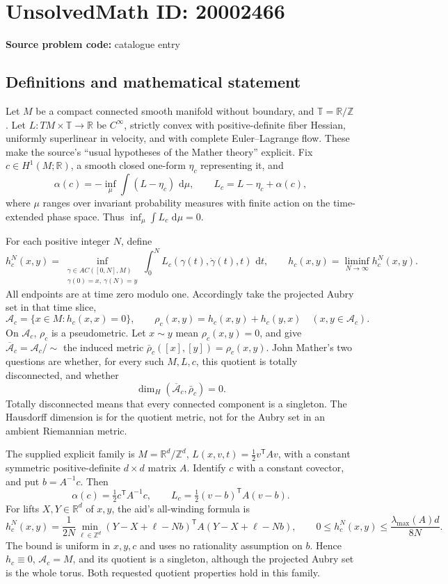 \documentclass[11pt]{article}
\newcommand{\Z}{\mathbb{Z}}
\newcommand{\R}{\mathbb{R}}
\newcommand{\dd}{\,\mathrm{d}}
\begin{document}
\section*{UnsolvedMath ID: 20002466}
\textbf{Source problem code:} catalogue entry
\subsection{Definitions and mathematical statement}
Let \(M\) be a compact connected smooth manifold without boundary, and \(\mathbb T=\R/\Z\). Let \(L:TM\times\mathbb T\to\R\) be \(C^\infty\), strictly convex with positive-definite fiber Hessian, uniformly superlinear in velocity, and with complete Euler--Lagrange flow. These make the source's ``usual hypotheses of the Mather theory'' explicit. Fix \(c\in H^1(M;\R)\), a smooth closed one-form \(\eta_c\) representing it, and
\[
 \alpha(c)=-\inf_\mu\int(L-\eta_c)\,\dd\mu,\qquad
 L_c=L-\eta_c+\alpha(c),
\]
where \(\mu\) ranges over invariant probability measures with finite action on the time-extended phase space. Thus \(\inf_\mu\int L_c\,\dd\mu=0\).

For each positive integer \(N\), define
\[
 h_c^N(x,y)=\inf_{\substack{\gamma\in AC([0,N],M)\\\gamma(0)=x,\ \gamma(N)=y}}
 \int_0^N L_c(\gamma(t),\dot\gamma(t),t)\,\dd t,
 \qquad h_c(x,y)=\liminf_{N\to\infty}h_c^N(x,y).
\]
All endpoints are at time zero modulo one. Accordingly take the projected Aubry set in that time slice,
\[
 \mathcal A_c=\{x\in M:h_c(x,x)=0\},\qquad
 \rho_c(x,y)=h_c(x,y)+h_c(y,x)\quad(x,y\in\mathcal A_c).
\]
On \(\mathcal A_c\), \(\rho_c\) is a pseudometric. Let \(x\sim y\) mean \(\rho_c(x,y)=0\), and give \(\overline{\mathcal A}_c=\mathcal A_c/\!\sim\) the induced metric \(\bar\rho_c([x],[y])=\rho_c(x,y)\). John Mather's two questions are whether, for every such \(M,L,c\), this quotient is totally disconnected, and whether
\[
 \dim_H(\overline{\mathcal A}_c,\bar\rho_c)=0.
\]
Totally disconnected means that every connected component is a singleton. The Hausdorff dimension is for the quotient metric, not for the Aubry set in an ambient Riemannian metric.

The supplied explicit family is \(M=\R^d/\Z^d\), \(L(x,v,t)=\tfrac12v^{\mathsf T}Av\), with a constant symmetric positive-definite \(d\times d\) matrix \(A\). Identify \(c\) with a constant covector, and put \(b=A^{-1}c\). Then
\[
 \alpha(c)=\tfrac12c^{\mathsf T}A^{-1}c,\qquad
 L_c=\tfrac12(v-b)^{\mathsf T}A(v-b).
\]
For lifts \(X,Y\in\R^d\) of \(x,y\), the aid's all-winding formula is
\[
 h_c^N(x,y)=\frac1{2N}\min_{\ell\in\Z^d}
 (Y-X+\ell-Nb)^{\mathsf T}A(Y-X+\ell-Nb),
 \qquad
 0\le h_c^N(x,y)\le\frac{\lambda_{\max}(A)d}{8N}.
\]
The bound is uniform in \(x,y,c\) and uses no rationality assumption on \(b\). Hence \(h_c\equiv0\), \(\mathcal A_c=M\), and its quotient is a singleton, although the projected Aubry set is the whole torus. Both requested quotient properties hold in this family.
\end{document}
